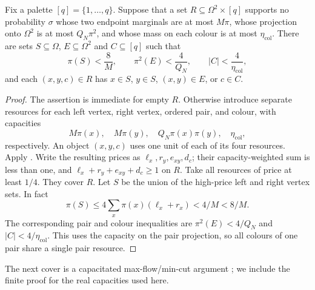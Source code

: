 \begin{lemma}\label{gt:coloured-cut}
Fix a palette \([q]=\{1,\ldots,q\}\).  Suppose that a set
\(R\subseteq\Omega^2\times[q]\) supports no probability \(\sigma\)
whose two endpoint marginals are at most \(M\pi\), whose projection
onto \(\Omega^2\) is at most \(Q_N\pi^2\), and whose mass on
each colour is at most \(\eta_{\mathrm{col}}\).
There are sets \(S\subseteq\Omega\), \(E\subseteq\Omega^2\)
and \(C\subseteq[q]\) such that
\begin{equation}\label{eq:coloured-terminal-cover}
 \pi(S)<\frac8M,\qquad
 \pi^2(E)<\frac4{Q_N},\qquad
 |C|<\frac4{\eta_{\mathrm{col}}},
\end{equation}
and each \((x,y,c)\in R\) has \(x\in S\), \(y\in S\),
\((x,y)\in E\), or \(c\in C\).
\end{lemma}
\begin{proof}
The assertion is immediate for empty \(R\).  Otherwise introduce
separate resources for each left vertex, right vertex, ordered pair,
and colour, with capacities
\[
 M\pi(x),\quad M\pi(y),\quad Q_N\pi(x)\pi(y),\quad
 \eta_{\mathrm{col}},
\]
respectively.  An object \((x,y,c)\) uses one unit of each of its
four resources.  Apply .  Write the resulting prices
as \(\ell_x,r_y,e_{xy},d_c\); their capacity-weighted sum is less
than one, and
\(\ell_x+r_y+e_{xy}+d_c\ge1\) on \(R\).
Take all resources of price at least \(1/4\).  They cover \(R\).
Let \(S\) be the union of the high-price left and right vertex
sets.  In fact
\[
 \pi(S)\le4\sum_x\pi(x)(\ell_x+r_x)<4/M<8/M.
\]
The corresponding pair and colour inequalities are
\(\pi^2(E)<4/Q_N\) and \(|C|<4/\eta_{\mathrm{col}}\).
This uses the capacity on the pair projection, so all colours of
one pair share a single pair resource.
\end{proof}

The next cover is a capacitated max-flow/min-cut argument
\citep{fordfulkerson1956}; we include the finite proof for the real
capacities used here.

